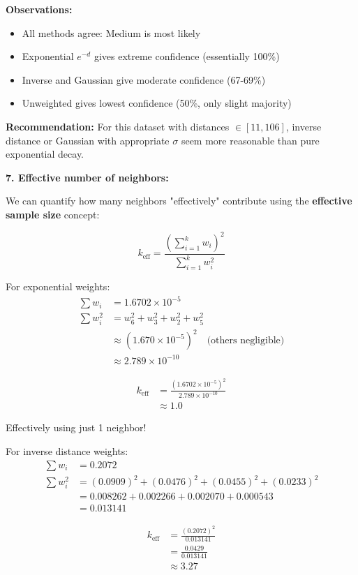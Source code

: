 \documentclass[12pt]{article}
\begin{document}
\begin{computation}
\textbf{Observations:}
\begin{itemize}
    \item All methods agree: Medium is most likely
    \item Exponential \(e^{-d}\) gives extreme confidence (essentially 100\%)
    \item Inverse and Gaussian give moderate confidence (67-69\%)
    \item Unweighted gives lowest confidence (50\%, only slight majority)
\end{itemize}

\textbf{Recommendation:} For this dataset with distances \(\in [11, 106]\), inverse distance or Gaussian with appropriate \(\sigma\) seem more reasonable than pure exponential decay.

\textbf{7. Effective number of neighbors:}

We can quantify how many neighbors "effectively" contribute using the \textbf{effective sample size} concept:

\[
k_{\text{eff}} = \frac{\left(\sum_{i=1}^k w_i\right)^2}{\sum_{i=1}^k w_i^2}
\]

For exponential weights:
\begin{align*}
\sum w_i &= 1.6702 \times 10^{-5} \\
\sum w_i^2 &= w_6^2 + w_3^2 + w_2^2 + w_5^2 \\
&\approx (1.670 \times 10^{-5})^2 \quad \text{(others negligible)} \\
&\approx 2.789 \times 10^{-10}
\end{align*}

\begin{align*}
k_{\text{eff}} &= \frac{(1.6702 \times 10^{-5})^2}{2.789 \times 10^{-10}} \\
&\approx 1.0
\end{align*}

Effectively using just 1 neighbor!

For inverse distance weights:
\begin{align*}
\sum w_i &= 0.2072 \\
\sum w_i^2 &= (0.0909)^2 + (0.0476)^2 + (0.0455)^2 + (0.0233)^2 \\
&= 0.008262 + 0.002266 + 0.002070 + 0.000543 \\
&= 0.013141
\end{align*}

\begin{align*}
k_{\text{eff}} &= \frac{(0.2072)^2}{0.013141} \\
&= \frac{0.0429}{0.013141} \\
&\approx 3.27
\end{align*}


\end{computation}
\end{document}
